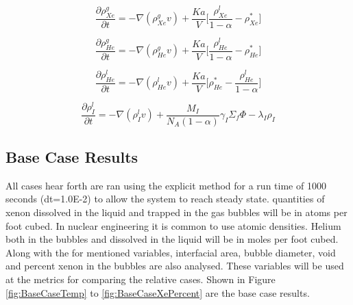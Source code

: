 \begin{equation}
    \frac{\partial \rho_{Xe}^{g}}{\partial t} = -\nabla (\rho_{Xe}^{g}v) + \frac{Ka}{V}\Big[\frac{\rho_{Xe}^{l}}{1-\alpha}  - \rho_{Xe}^{*}\Big]
    \label{eq:XenonGasCaseStudyDiffEq}
\end{equation}

\begin{equation}
    \frac{\partial \rho_{He}^{g}}{\partial t} = -\nabla (\rho_{He}^{g}v) + \frac{Ka}{V}\Big[\frac{\rho_{He}^{l}}{1-\alpha}  - \rho_{He}^{*}\Big]
    \label{eq:HeGasCaseStudyDiffEq}
\end{equation}

\begin{equation}
    \frac{\partial \rho_{He}^{l}}{\partial t} = -\nabla (\rho_{He}^{l}v) + \frac{Ka}{V}\Big[ \rho_{He}^{*} - \frac{\rho_{He}^{l}}{1-\alpha}\Big]
    \label{eq:heliumLiqCaseStudyDiffEq}
\end{equation}

\begin{equation}
    \frac{\partial \rho_{I}^{l}}{\partial t} = -\nabla (\rho_{I}^{l}v) + \frac{M_{I}}{N_{A}(1-\alpha)} \gamma_{I}\Sigma_{f}\Phi - \lambda_{I}\rho_{I}
    \label{eq:IodineLiqCaseStudyDiffEq}
\end{equation}

\subsection{Base Case Results}
All cases hear forth are ran using the explicit method for a run time of 1000 seconds (dt=1.0E-2) to allow the system to reach steady state. quantities of xenon dissolved in the liquid and trapped in the gas bubbles will be in atoms per foot cubed. In nuclear engineering it is common to use atomic densities. Helium both in the bubbles and dissolved in the liquid will be in moles per foot cubed. Along with the for mentioned variables, interfacial area, bubble diameter, void and percent xenon in the bubbles are also analysed. These variables will be used at the metrics for comparing the relative cases. Shown in Figure \ref{fig:BaseCaseTemp} to \ref{fig:BaseCaseXePercent} are the base case results.

\vspace{12.7mm} %

